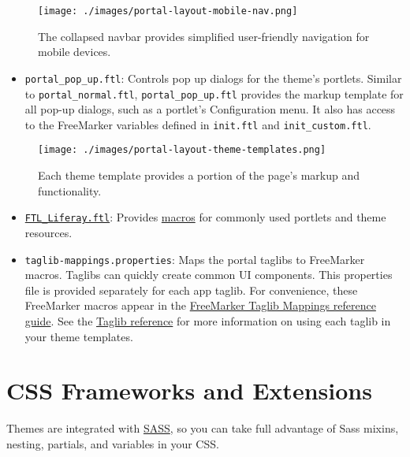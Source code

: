 \begin{figure}
\centering
\texttt{[image: ./images/portal-layout-mobile-nav.png]}
\caption{The collapsed navbar provides simplified user-friendly
navigation for mobile devices.}
\end{figure}

\begin{itemize}
\tightlist
\item
  \texttt{portal\_pop\_up.ftl}: Controls pop up dialogs for the theme's
  portlets. Similar to \texttt{portal\_normal.ftl},
  \texttt{portal\_pop\_up.ftl} provides the markup template for all
  pop-up dialogs, such as a portlet's Configuration menu. It also has
  access to the FreeMarker variables defined in \texttt{init.ftl} and
  \texttt{init\_custom.ftl}.
\end{itemize}

\begin{figure}
\centering
\texttt{[image: ./images/portal-layout-theme-templates.png]}
\caption{Each theme template provides a portion of the page's markup and
functionality.}
\end{figure}

\begin{itemize}
\item
  \href{https://github.com/liferay/liferay-portal/blob/7.2.x/modules/apps/portal-template/portal-template-freemarker/src/main/resources/FTL_liferay.ftl}{\texttt{FTL\_Liferay.ftl}}:
  Provides
  \href{/docs/7-2/reference/-/knowledge_base/r/product-freemarker-macros}{macros}
  for commonly used portlets and theme resources.
\item
  \texttt{taglib-mappings.properties}: Maps the portal taglibs to
  FreeMarker macros. Taglibs can quickly create common UI components.
  This properties file is provided separately for each app taglib. For
  convenience, these FreeMarker macros appear in the
  \href{/docs/7-2/reference/-/knowledge_base/r/freemarker-taglib-macros}{FreeMarker
  Taglib Mappings reference guide}. See the
  \href{/docs/7-2/reference/-/knowledge_base/r/front-end-taglibs}{Taglib
  reference} for more information on using each taglib in your theme
  templates.
\end{itemize}

\section{CSS Frameworks and
Extensions}\label{css-frameworks-and-extensions}

Themes are integrated with \href{https://sass-lang.com/}{SASS}, so you
can take full advantage of Sass mixins, nesting, partials, and variables
in your CSS.

